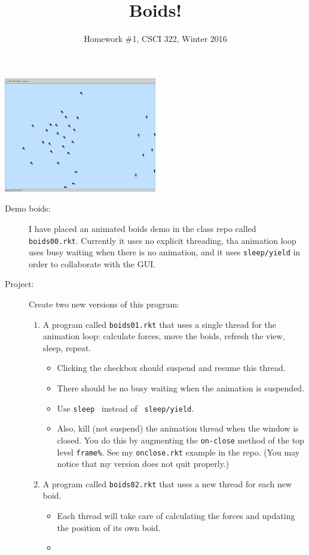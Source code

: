 \documentclass{article}
\title{Boids!}
\author{Homework \#1, CSCI 322, Winter 2016}
\date{}
\begin{document}
\maketitle
\centerline{\includegraphics[width=0.5\textwidth]{boids.png}}
\begin{description}
\item[Demo boids:]  I have placed an animated boids demo in the class
  repo called {\tt boids00.rkt}.  Currently it uses no explicit
  threading, tha animation loop uses busy waiting when there is no
  animation, and it uses {\tt sleep/yield} in order to collaborate
  with the GUI.
\item[Project:]
  Create two new versions of this program:
  \begin{enumerate}
\item A program called {\tt boids01.rkt} that uses a single thread
  for the animation loop:  calculate forces, move the boids, refresh
  the view, sleep, repeat.
  \begin{itemize}
    \item Clicking the checkbox should suspend and
  resume this thread. \item There should be no busy waiting when the
  animation is suspended.  \item Use {\tt sleep } instead of {\tt
    sleep/yield}.
\item
  Also, kill (not suspend) the animation thread when the window is
  closed.  You do this by augmenting the {\tt on-close} method of the
  top level {\tt frame\%}.  See my {\tt onclose.rkt} example in the
  repo.  (You may notice that my version does not quit properly.)
\end{itemize}
\item A program called {\tt boids02.rkt} that uses a new thread for
  each new boid.
  \begin{itemize}
  \item Each thread will take care of calculating the
  forces and updating the position of its own boid.
\item

\end{itemize}
\end{enumerate}
\end{description}
\end{document}
